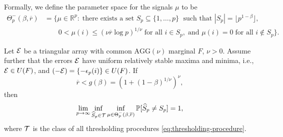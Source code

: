 Formally, we define the parameter space for the signals $\mu$ to be
\begin{align} \label{eq:minimax-signal-config-under}
    \Theta_p^-(\beta, \overline{r}) &= \{\mu\in\mathbb{R}^p:\;\text{there exists a set }S_p\subseteq\{1,\ldots,p\}\;\text{ such that }|S_p|=\lfloor p^{1-\beta}\rfloor, \nonumber \\
    &\quad\quad0<\mu(i)\le(\nu\overline{r}\log{p})^{1/\nu}\;\text{for all }i\in S_p,\;\text{and }\mu(i)=0\;\text{for all }i\not\in S_p\}.
\end{align}


\begin{theorem} \label{thm:necessary}
    Let ${\cal E}$ be a triangular array with common $\text{AGG}(\nu)$ marginal $F$, $\nu > 0$.
    Assume further that the errors ${\cal E}$ have uniform relatively stable maxima and minima, i.e., ${\cal E}\in U(F)$, and $(-{\cal E}) = \{-\epsilon_{p}(i)\} \in U(F)$.
    If 
    \begin{equation} \label{eq:signal-below-boundary}
        \overline{r} < g(\beta) = \left(1+(1-\beta)^{1/\nu}\right)^\nu,
    \end{equation}
    then
    \begin{equation} \label{eq:classification-impossible-dependent}
        \lim_{p\to\infty} \inf_{\widehat{S}_p\in{\cal T}} \inf_{\mu\in{\Theta_p^-(\beta, \overline{r})}} \P[\widehat{S}_p \neq S_p] = 1,
    \end{equation}
    where ${\cal T}$ is the class of all thresholding procedures \eqref{eq:thresholding-procedure}.
\end{theorem}
